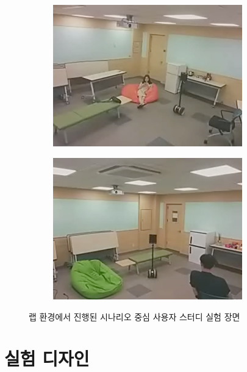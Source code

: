 \begin{figure}
\begin{subfigure}{.5\textwidth}
  \centering
  \includegraphics[width=0.9\textwidth]{images/sceneA}
\end{subfigure}
\begin{subfigure}{.5\textwidth}
  \centering
  \includegraphics[width=0.9\textwidth]{images/sceneB}
\end{subfigure}
\caption{랩 환경에서 진행된 시나리오 중심 사용자 스터디 실험 장면}
\label{fig:userstudy_scene}
\end{figure}


\section{실험 디자인}

